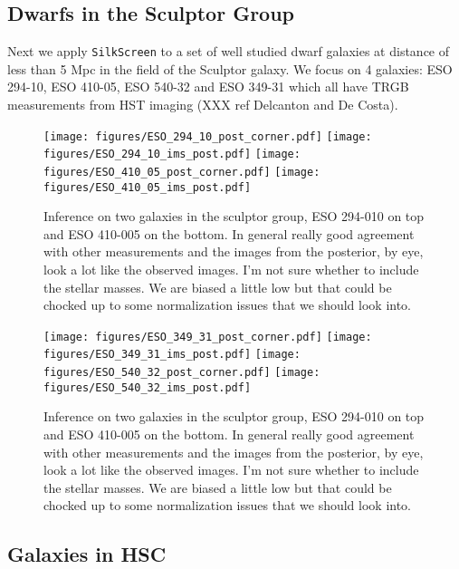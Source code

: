 \documentclass[twocolumn]{aastex631}
\newcommand{\code}[0]{\texttt{SilkScreen}}
\begin{document}
\subsection{Dwarfs in the Sculptor Group}
\label{sec:scul}
Next we apply \code{} to a set of well studied dwarf galaxies at distance of less than 5 Mpc in the field of the Sculptor galaxy. We focus on 4 galaxies: ESO 294-10, ESO 410-05, ESO 540-32 and ESO 349-31 which all have TRGB measurements from HST imaging (XXX ref Delcanton and De Costa).

\begin{figure*}
    \centering
    \texttt{[image: figures/ESO\_294\_10\_post\_corner.pdf]}
    \texttt{[image: figures/ESO\_294\_10\_ims\_post.pdf]}
    \texttt{[image: figures/ESO\_410\_05\_post\_corner.pdf]}
    \texttt{[image: figures/ESO\_410\_05\_ims\_post.pdf]}
    \caption{Inference on two galaxies in the sculptor group, ESO 294-010 on top and ESO 410-005 on the bottom. In general really good agreement with other measurements and the images from the posterior, by eye, look a lot like the observed images. I'm not sure whether to include the stellar masses. We are biased a little low but that could be chocked up to some normalization issues that we should look into.}
    \label{fig:sdw_2mpc}
\end{figure*}

\begin{figure*}
    \centering
    \texttt{[image: figures/ESO\_349\_31\_post\_corner.pdf]}
    \texttt{[image: figures/ESO\_349\_31\_ims\_post.pdf]}
    \texttt{[image: figures/ESO\_540\_32\_post\_corner.pdf]}
    \texttt{[image: figures/ESO\_540\_32\_ims\_post.pdf]}
    \caption{Inference on two galaxies in the sculptor group, ESO 294-010 on top and ESO 410-005 on the bottom. In general really good agreement with other measurements and the images from the posterior, by eye, look a lot like the observed images. I'm not sure whether to include the stellar masses. We are biased a little low but that could be chocked up to some normalization issues that we should look into.}
    \label{fig:sdw_3mpc}
    
\end{figure*}
\subsection{Galaxies in HSC}
\label{sec:hsc}
\end{document}
